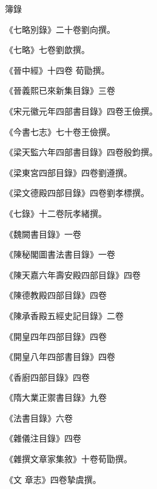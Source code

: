 \begin{pinyinscope}
 簿錄



 《七略別錄》二十卷劉向撰。



 《七略》七卷劉歆撰。



 《晉中經》十四卷
 荀勖撰。



 《晉義熙已來新集目錄》三卷



 《宋元徽元年四部書目錄》四卷王儉撰。



 《今書七志》七十卷王儉撰。



 《梁天監六年四部書目錄》四卷殷鈞撰。



 《梁東宮四部目錄》四卷劉遵撰。



 《梁文德殿四部目錄》四卷劉孝標撰。



 《七錄》十二卷阮孝緒撰。



 《魏闕書目錄》一卷



 《陳秘閣圖書法書目錄》一卷



 《陳天嘉六年壽安殿四部目錄》四卷



 《陳德教殿四部目錄》四卷



 《陳承香殿五經史記目錄》二卷



 《開皇四年四部目錄》四卷



 《開皇八年四部書目錄》四卷



 《香廚四部目錄》四卷



 《隋大業正禦書目錄》九卷



 《法書目錄》六卷



 《雜儀注目錄》四卷



 《雜撰文章家集敘》十卷荀勖撰。



 《文
 章志》四卷摯虞撰。




\end{pinyinscope}

